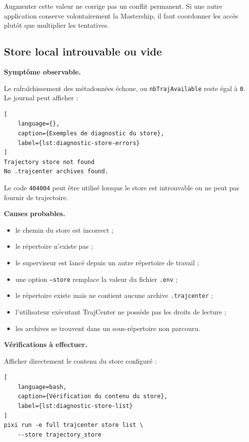 \documentclass{rapportENSAM}
\begin{document}
Augmenter cette valeur ne corrige pas un conflit permanent. Si une autre
application conserve volontairement la Mastership, il faut coordonner les
accès plutôt que multiplier les tentatives.


\subsection{Store local introuvable ou vide}
\label{subsec:diagnostic-store}

\textbf{Symptôme observable.}

Le rafraîchissement des métadonnées échoue, ou
\texttt{nbTrajAvailable} reste égal à \texttt{0}. Le journal peut afficher :

\begin{lstlisting}[
    language={},
    caption={Exemples de diagnostic du store},
    label={lst:diagnostic-store-errors}
]
Trajectory store not found
No .trajcenter archives found.
\end{lstlisting}

Le code \texttt{404004} peut être utilisé lorsque le store est introuvable ou
ne peut pas fournir de trajectoire.

\textbf{Causes probables.}

\begin{itemize}
    \item le chemin du store est incorrect ;
    \item le répertoire n'existe pas ;
    \item le superviseur est lancé depuis un autre répertoire de travail ;
    \item une option \texttt{--store} remplace la valeur du fichier
    \texttt{.env} ;
    \item le répertoire existe mais ne contient aucune archive
    \texttt{.trajcenter} ;
    \item l'utilisateur exécutant TrajCenter ne possède pas les droits de
    lecture ;
    \item les archives se trouvent dans un sous-répertoire non parcouru.
\end{itemize}

\textbf{Vérifications à effectuer.}

Afficher directement le contenu du store configuré :

\begin{lstlisting}[
    language=bash,
    caption={Vérification du contenu du store},
    label={lst:diagnostic-store-list}
]
pixi run -e full trajcenter store list \
    --store trajectory_store
\end{lstlisting}
\end{document}
